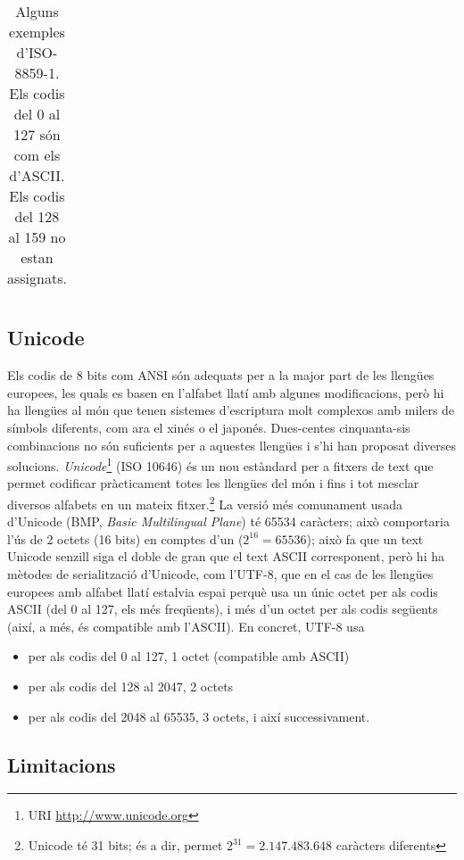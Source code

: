 \begin{table}
\begin{center}
\begin{tabular}{c|l|l}
\end{tabular}
\end{center}
\caption{Alguns exemples d'ISO-8859-1. Els codis del 0 al 127 són com
  els d'ASCII. Els codis del 128 al 159 no estan assignats.}
\label{tb:ISO88591}
\end{table}

\subsection{Unicode}

Els codis de 8 bits com ANSI són adequats per a la major part de les
llengües europees, les quals es basen en l'alfabet llatí amb algunes
modificacions, però hi ha llengües al món que tenen sistemes
d'escriptura molt complexos amb milers de símbols diferents, com ara
el xinés o el japonés. Dues-centes cinquanta-sis combinacions no són
suficients per a aquestes llengües i s'hi han proposat diverses
solucions. 
\emph{Unicode}\footnote{URI \url{http://www.unicode.org}} 
(ISO 10646) és un nou estàndard per a
fitxers de text que permet codificar pràcticament totes les llengües
del món i fins i tot mesclar diversos alfabets en un mateix
fitxer.\footnote{Unicode té 31 bits; és a dir, permet
  $2^{31}=2.147.483.648$ caràcters diferents} La versió més comunament
usada d'Unicode (BMP, \emph{Basic Multilingual Plane}) té 65534
caràcters; això comportaria l'ús de 2 octets (16 bits) en comptes d'un
($2^{16}=65536$); això fa  que un text Unicode senzill siga el doble
de gran que el text ASCII corresponent, però hi ha mètodes de
serialització d'Unicode, com l'UTF-8, que en el cas de les llengües
europees amb alfabet llatí estalvia espai perquè usa un únic octet per
als codis ASCII (del 0 al 127, els més freqüents), i més d'un octet
per als codis següents (així, a més, és compatible amb l'ASCII). En
concret, UTF-8 usa
\begin{itemize}
\item per als codis del 0 al 127, 1 octet (compatible amb  ASCII)
\item per als codis del 128 al 2047, 2 octets
\item per als codis del 2048 al 65535, 3 octets, i així successivament.
\end{itemize}

\subsection{Limitacions}


